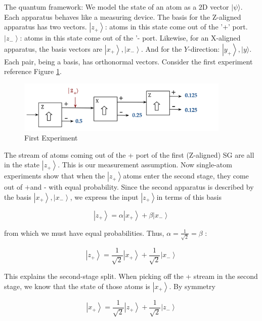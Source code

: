 \documentclass[main.tex]{subfiles}
\begin{document}
    The quantum framework: We model the state of an atom as a $2 \mathrm{D}$ vector $|\psi\rangle$. Each apparatus behaves like a measuring device. The basis for the Z-aligned apparatus has two vectors. $\left|z_{+}\right\rangle$: atoms in this state come out of the '+' port. $\left|z_{-}\right\rangle$: atoms in this state come out of the '- port. Likewise, for an X-aligned apparatus, the basis vectors are $\left|x_{+}\right\rangle,\left|x_{-}\right\rangle$. And for the $Y$-direction: $\left|y_{+}\right\rangle,|y\rangle$. Each pair, being a basis, has orthonormal vectors. Consider the first experiment reference Figure \ref{fig:52sg5}.
    
    \begin{figure}
        \centering
        \includegraphics[width=4in]{notes/figs/n05/52sg5.png}
        \caption{First Experiment}
        \label{fig:52sg5}
    \end{figure}
    
    The stream of atoms coming out of the + port of the first (Z-aligned) SG are all in the state $\left|z_{+}\right\rangle$. This is our measurement assumption. Now single-atom experiments show that when the $\left|z_{+}\right\rangle$atoms enter the second stage, they come out of $+$and - with equal probability. Since the second apparatus is described by the basis $\left|x_{+}\right\rangle,\left|x_{-}\right\rangle$, we express the input $\left|z_{+}\right\rangle$in terms of this basis
    
    $$
    \left|z_{+}\right\rangle=\alpha\left|x_{+}\right\rangle+\beta\left|x_{-}\right\rangle
    $$
    
    from which we must have equal probabilities. Thus, $\alpha=\frac{1}{\sqrt{2}}=\beta$ :
    
    $$
    \left|z_{+}\right\rangle=\frac{1}{\sqrt{2}}\left|x_{+}\right\rangle+\frac{1}{\sqrt{2}}\left|x_{-}\right\rangle
    $$
    
    This explains the second-stage split. When picking off the + stream in the second stage, we know that the state of those atoms is $\left|x_{+}\right\rangle$. By symmetry
    
    $$
    \left|x_{+}\right\rangle=\frac{1}{\sqrt{2}}\left|z_{+}\right\rangle+\frac{1}{\sqrt{2}}\left|z_{-}\right\rangle
    $$
    
\end{document}
